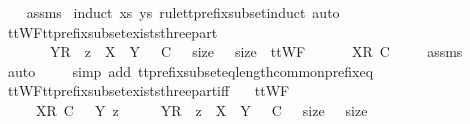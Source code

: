 \begin{isabellebody}
%
\isadelimproof
\ \ %
\endisadelimproof
%
\isatagproof
{}\isamarkupfalse%
\ assms\ \isamarkupfalse%
{\isacharparenleft}induct\ xs\ ys\ rule{\isacharcolon}tt{\isacharunderscore}prefix{\isacharunderscore}subset{\isachardot}induct{\isacharcomma}\ auto{\isacharparenright}%
\endisatagproof
{\isafoldproof}%
%
\isadelimproof
\isanewline
%
\endisadelimproof
\isanewline
{}\isamarkupfalse%
\ ttWF{\isacharunderscore}tt{\isacharunderscore}prefix{\isacharunderscore}subset{\isacharunderscore}exists{\isacharunderscore}three{\isacharunderscore}part{\isacharprime}{\isacharcolon}\isanewline
\ \ \ {\isachardoublequoteopen}{\isasymsigma}\ {\isacharequal}\ {\isasymrho}\ {\isacharat}\ {\isacharparenleft}{\isacharbrackleft}{\isacharbrackleft}Y{\isacharbrackright}\isactrlsub R{\isacharbrackright}\ {\isacharat}\ z{\isacharparenright}\ {\isasymand}\ X\ {\isasymsubseteq}\ Y\ {\isasymand}\ {\isasymrho}\ {\isasymlesssim}\isactrlsub C\ {\isasymrho}\ {\isasymand}\ size\ {\isasymrho}\ {\isacharequal}\ size\ {\isasymrho}{\isachardoublequoteclose}\ {\isachardoublequoteopen}ttWF\ {\isasymsigma}{\isachardoublequoteclose}\isanewline
\ \ \ {\isachardoublequoteopen}{\isasymrho}\ {\isacharat}\ {\isacharbrackleft}{\isacharbrackleft}X{\isacharbrackright}\isactrlsub R{\isacharbrackright}\ {\isasymlesssim}\isactrlsub C\ {\isasymsigma}{\isachardoublequoteclose}\isanewline
%
\isadelimproof
\ \ %
\endisadelimproof
%
\isatagproof
{}\isamarkupfalse%
\ assms\ \isamarkupfalse%
\ auto\ \isanewline
\ \ \isamarkupfalse%
\ {\isacharparenleft}simp\ add{\isacharcolon}\ tt{\isacharunderscore}prefix{\isacharunderscore}subset{\isacharunderscore}eq{\isacharunderscore}length{\isacharunderscore}common{\isacharunderscore}prefix{\isacharunderscore}eq{\isacharparenright}%
\endisatagproof
{\isafoldproof}%
%
\isadelimproof
\isanewline
%
\endisadelimproof
\isanewline
{}\isamarkupfalse%
\ ttWF{\isacharunderscore}tt{\isacharunderscore}prefix{\isacharunderscore}subset{\isacharunderscore}exists{\isacharunderscore}three{\isacharunderscore}part{\isacharunderscore}iff{\isacharcolon}\isanewline
\ \ \ {\isachardoublequoteopen}ttWF\ {\isasymsigma}{\isachardoublequoteclose}\isanewline
\ \ \ {\isachardoublequoteopen}{\isasymrho}\ {\isacharat}\ {\isacharbrackleft}{\isacharbrackleft}X{\isacharbrackright}\isactrlsub R{\isacharbrackright}\ {\isasymlesssim}\isactrlsub C\ {\isasymsigma}\ {\isacharequal}\ {\isacharparenleft}{\isasymexists}Y\ z\ {\isasymrho}\ {\isasymsigma}\ {\isacharequal}\ {\isasymrho}\ {\isacharat}\ {\isacharparenleft}{\isacharbrackleft}{\isacharbrackleft}Y{\isacharbrackright}\isactrlsub R{\isacharbrackright}\ {\isacharat}\ z{\isacharparenright}\ {\isasymand}\ X\ {\isasymsubseteq}\ Y\ {\isasymand}\ {\isasymrho}\ {\isasymlesssim}\isactrlsub C\ {\isasymrho}\ {\isasymand}\ size\ {\isasymrho}\ {\isacharequal}\ size\ {\isasymrho}{\isacharparenright}{\isachardoublequoteclose}\isanewline

\end{isabellebody}

